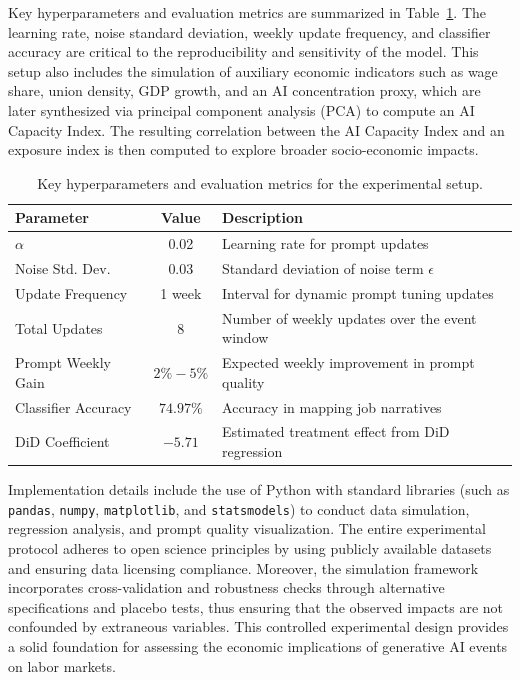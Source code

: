 \documentclass{article}
\begin{document}
Key hyperparameters and evaluation metrics are summarized in Table~\ref{tab:exp_params}. The learning rate, noise standard deviation, weekly update frequency, and classifier accuracy are critical to the reproducibility and sensitivity of the model. This setup also includes the simulation of auxiliary economic indicators such as wage share, union density, GDP growth, and an AI concentration proxy, which are later synthesized via principal component analysis (PCA) to compute an AI Capacity Index. The resulting correlation between the AI Capacity Index and an exposure index is then computed to explore broader socio-economic impacts.

\begin{table}[h]
\centering
\begin{tabular}{lcl}
\hline
\textbf{Parameter} & \textbf{Value} & \textbf{Description} \\
\hline
\( \alpha \) & 0.02 & Learning rate for prompt updates \\
Noise Std. Dev. & 0.03 & Standard deviation of noise term \( \epsilon \) \\
Update Frequency & 1 week & Interval for dynamic prompt tuning updates \\
Total Updates & 8 & Number of weekly updates over the event window \\
Prompt Weekly Gain & \(2\%-5\%\) & Expected weekly improvement in prompt quality \\
Classifier Accuracy & \(74.97\%\) & Accuracy in mapping job narratives \\
DiD Coefficient & \(-5.71\) & Estimated treatment effect from DiD regression \\
\hline
\end{tabular}
\caption{Key hyperparameters and evaluation metrics for the experimental setup.}
\label{tab:exp_params}
\end{table}

Implementation details include the use of Python with standard libraries (such as \texttt{pandas}, \texttt{numpy}, \texttt{matplotlib}, and \texttt{statsmodels}) to conduct data simulation, regression analysis, and prompt quality visualization. The entire experimental protocol adheres to open science principles by using publicly available datasets and ensuring data licensing compliance. Moreover, the simulation framework incorporates cross-validation and robustness checks through alternative specifications and placebo tests, thus ensuring that the observed impacts are not confounded by extraneous variables. This controlled experimental design provides a solid foundation for assessing the economic implications of generative AI events on labor markets.
\end{document}
